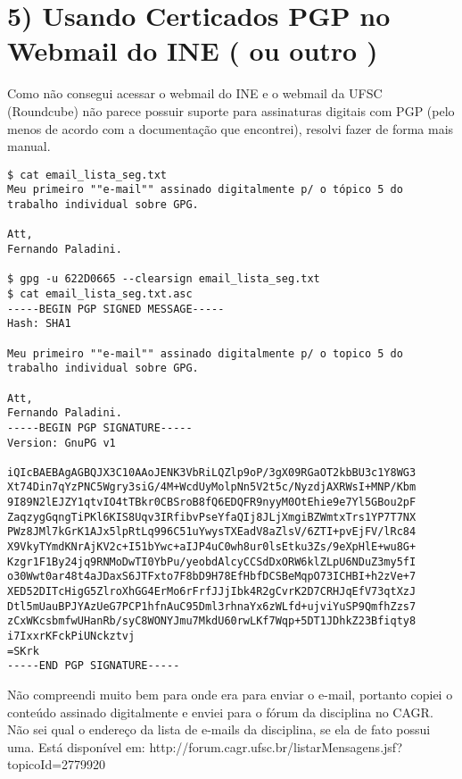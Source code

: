 \documentclass[a4paper,11pt]{article}
\theoremstyle{mytheor}
\begin{document}
\section*{5)  Usando Certicados PGP no Webmail do INE ( ou outro )}

Como não consegui acessar o webmail do INE e o webmail da UFSC (Roundcube) não parece possuir suporte para assinaturas digitais com PGP (pelo menos de acordo com a documentação que encontrei), resolvi fazer de forma mais manual.

\begin{lstlisting}
$ cat email_lista_seg.txt
Meu primeiro ""e-mail"" assinado digitalmente p/ o tópico 5 do trabalho individual sobre GPG.

Att,
Fernando Paladini.

$ gpg -u 622D0665 --clearsign email_lista_seg.txt
$ cat email_lista_seg.txt.asc
-----BEGIN PGP SIGNED MESSAGE-----
Hash: SHA1

Meu primeiro ""e-mail"" assinado digitalmente p/ o topico 5 do trabalho individual sobre GPG.

Att,
Fernando Paladini.
-----BEGIN PGP SIGNATURE-----
Version: GnuPG v1

iQIcBAEBAgAGBQJX3C10AAoJENK3VbRiLQZlp9oP/3gX09RGaOT2kbBU3c1Y8WG3
Xt74Din7qYzPNC5Wgry3siG/4M+WcdUyMolpNn5V2t5c/NyzdjAXRWsI+MNP/Kbm
9I89N2lEJZY1qtvIO4tTBkr0CBSroB8fQ6EDQFR9nyyM0OtEhie9e7Yl5GBou2pF
ZaqzygGqngTiPKl6KIS8Uqv3IRfibvPseYfaQIj8JLjXmgiBZWmtxTrs1YP7T7NX
PWz8JMl7kGrK1AJx5lpRtLq996C51uYwysTXEadV8aZlsV/6ZTI+pvEjFV/lRc84
X9VkyTYmdKNrAjKV2c+I51bYwc+aIJP4uC0wh8ur0lsEtku3Zs/9eXpHlE+wu8G+
Kzgr1F1By24jq9RNMoDwTI0YbPu/yeobdAlcyCCSdDxORW6klZLpU6NDuZ3my5fI
o30Wwt0ar48t4aJDaxS6JTFxto7F8bD9H78EfHbfDCSBeMqpO73ICHBI+h2zVe+7
XED52DITcHigG5ZlroXhGG4ErMo6rFrfJJjIbk4R2gCvrK2D7CRHJqEfV73qtXzJ
Dtl5mUauBPJYAzUeG7PCP1hfnAuC95Dml3rhnaYx6zWLfd+ujviYuSP9QmfhZzs7
zCxWKcsbmfwUHanRb/syC8WONYJmu7MkdU60rwLKf7Wqp+5DT1JDhkZ23Bfiqty8
i7IxxrKFckPiUNckztvj
=SKrk
-----END PGP SIGNATURE-----

\end{lstlisting}

Não compreendi muito bem para onde era para enviar o e-mail, portanto copiei o conteúdo assinado digitalmente e enviei para o fórum da disciplina no CAGR. Não sei qual o endereço da lista de e-mails da disciplina, se ela de fato possui uma. Está disponível em: http://forum.cagr.ufsc.br/listarMensagens.jsf?topicoId=2779920
\end{document}
